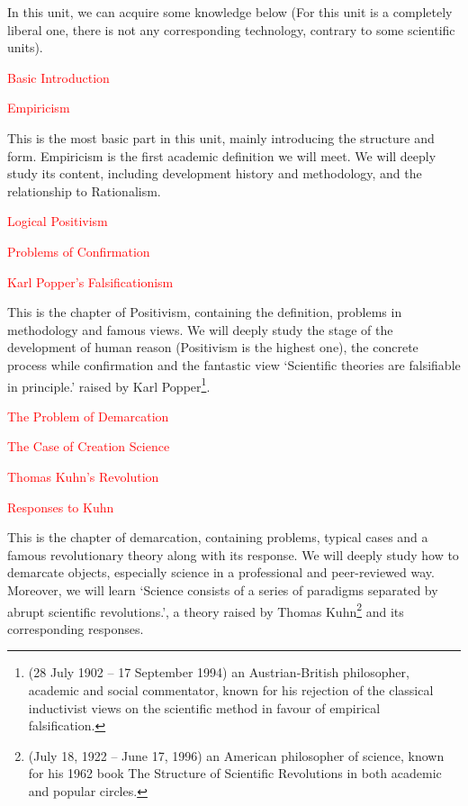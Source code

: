 \documentclass[12pt, a4paper]{article}
\begin{document}
In this unit, we can acquire some knowledge below (For this unit is a completely liberal one, there is not any corresponding technology, contrary to some scientific units).
 
\centerline {\textcolor{red}{Basic Introduction}}

\centerline {\textcolor{red}{Empiricism}}

This is the most basic part in this unit, mainly introducing the structure and form. Empiricism is the first academic definition we will meet. We will deeply study its content, including development history and methodology, and the relationship to Rationalism.
 
\centerline {\textcolor{red}{Logical Positivism}}

\centerline {\textcolor{red}{Problems of Confirmation}}

\centerline {\textcolor{red}{Karl Popper's Falsificationism}}

This is the chapter of Positivism, containing the definition, problems in methodology and famous views. We will deeply study the stage of the development of human reason (Positivism is the highest one), the concrete process while confirmation and the fantastic view ‘Scientific theories are falsifiable in principle.’ raised by Karl Popper\footnote{(28 July 1902 – 17 September 1994) an Austrian-British philosopher, academic and social commentator, known for his rejection of the classical inductivist views on the scientific method in favour of empirical falsification.}. 

\centerline {\textcolor{red}{The Problem of Demarcation}}

\centerline {\textcolor{red}{The Case of Creation Science}}

\centerline {\textcolor{red}{Thomas Kuhn's Revolution}}

\centerline {\textcolor{red}{Responses to Kuhn}}

This is the chapter of demarcation, containing problems, typical cases and a famous revolutionary theory along with its response. We will deeply study how to demarcate objects, especially science in a professional and peer-reviewed way. Moreover, we will learn ‘Science consists of a series of paradigms separated by abrupt scientific revolutions.’, a theory raised by Thomas Kuhn\footnote{(July 18, 1922 – June 17, 1996) an American philosopher of science, known for his 1962 book The Structure of Scientific Revolutions in both academic and popular circles.} and its corresponding responses. 
\end{document}

